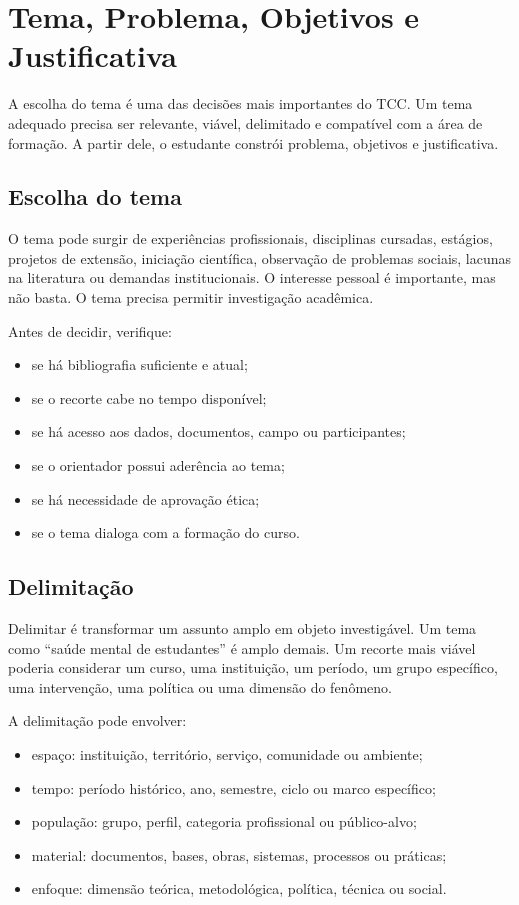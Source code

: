 \chapter{Tema, Problema, Objetivos e Justificativa}

A escolha do tema é uma das decisões mais importantes do TCC. Um tema adequado precisa ser relevante, viável, delimitado e compatível com a área de formação. A partir dele, o estudante constrói problema, objetivos e justificativa.

\section{Escolha do tema}

O tema pode surgir de experiências profissionais, disciplinas cursadas, estágios, projetos de extensão, iniciação científica, observação de problemas sociais, lacunas na literatura ou demandas institucionais. O interesse pessoal é importante, mas não basta. O tema precisa permitir investigação acadêmica.

Antes de decidir, verifique:

\begin{itemize}
  \item se há bibliografia suficiente e atual;
  \item se o recorte cabe no tempo disponível;
  \item se há acesso aos dados, documentos, campo ou participantes;
  \item se o orientador possui aderência ao tema;
  \item se há necessidade de aprovação ética;
  \item se o tema dialoga com a formação do curso.
\end{itemize}

\section{Delimitação}

Delimitar é transformar um assunto amplo em objeto investigável. Um tema como ``saúde mental de estudantes'' é amplo demais. Um recorte mais viável poderia considerar um curso, uma instituição, um período, um grupo específico, uma intervenção, uma política ou uma dimensão do fenômeno.

A delimitação pode envolver:

\begin{itemize}
  \item espaço: instituição, território, serviço, comunidade ou ambiente;
  \item tempo: período histórico, ano, semestre, ciclo ou marco específico;
  \item população: grupo, perfil, categoria profissional ou público-alvo;
  \item material: documentos, bases, obras, sistemas, processos ou práticas;
  \item enfoque: dimensão teórica, metodológica, política, técnica ou social.
\end{itemize}

